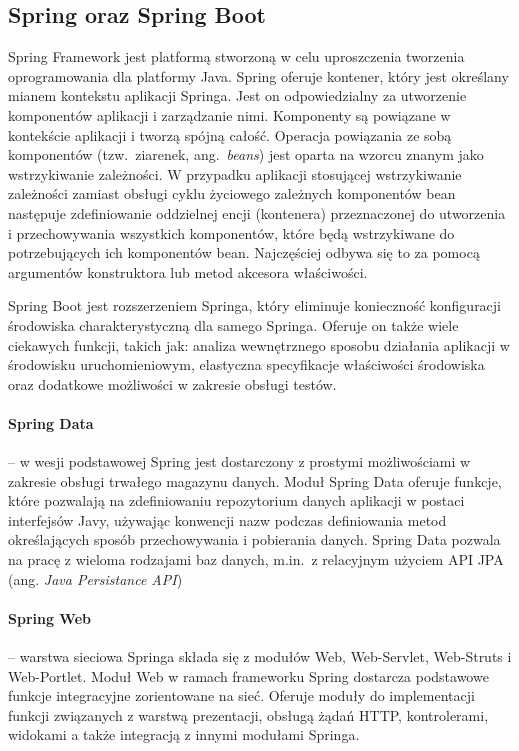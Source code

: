 \subsection{Spring oraz Spring Boot}
Spring Framework jest platformą stworzoną w celu uproszczenia tworzenia oprogramowania dla platformy Java. Spring oferuje kontener, który jest określany mianem kontekstu aplikacji Springa. Jest on odpowiedzialny za utworzenie komponentów aplikacji i zarządzanie nimi. Komponenty są powiązane w kontekście aplikacji i tworzą spójną całość. Operacja powiązania ze sobą komponentów (tzw.\ ziarenek, ang.~\emph{beans}) jest oparta na wzorcu znanym jako wstrzykiwanie zależności. W przypadku aplikacji stosującej wstrzykiwanie zależności zamiast obsługi cyklu życiowego zależnych komponentów bean następuje zdefiniowanie oddzielnej encji (kontenera) przeznaczonej do utworzenia i przechowywania wszystkich komponentów, które będą wstrzykiwane do potrzebujących ich komponentów bean. Najczęściej odbywa się to za pomocą argumentów konstruktora lub metod akcesora właściwości. 

Spring Boot jest rozszerzeniem Springa, który eliminuje konieczność konfiguracji środowiska charakterystyczną dla samego Springa. Oferuje on także wiele ciekawych funkcji, takich jak: analiza wewnętrznego sposobu działania aplikacji w środowisku uruchomieniowym, elastyczna specyfikacje właściwości środowiska oraz dodatkowe możliwości w zakresie obsługi testów.

\paragraph{Spring Data} -- w wesji podstawowej Spring jest dostarczony z prostymi możliwościami w zakresie obsługi trwałego magazynu danych. Moduł Spring Data oferuje funkcje, które pozwalają na zdefiniowaniu repozytorium danych aplikacji w postaci interfejsów Javy, używając konwencji nazw podczas definiowania metod określających sposób przechowywania i pobierania danych. Spring Data pozwala na pracę z wieloma rodzajami baz danych, m.in.\ z relacyjnym użyciem API JPA (ang. \emph{Java Persistance API})

\paragraph{Spring Web} -- warstwa sieciowa Springa składa się z modułów Web, Web-Servlet, Web-Struts i Web-Portlet. Moduł Web w ramach frameworku Spring dostarcza podstawowe funkcje integracyjne zorientowane na sieć. Oferuje moduły do implementacji funkcji związanych z warstwą prezentacji, obsługą żądań HTTP, kontrolerami, widokami a także integracją z innymi modułami Springa.



